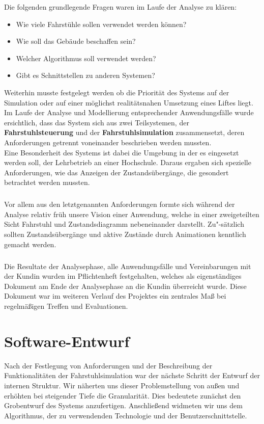Die folgenden grundlegende Fragen waren im Laufe der Analyse zu klären:
\begin{itemize}
	\item Wie viele Fahrstühle sollen verwendet werden können?
	\item Wie soll das Gebäude beschaffen sein?
	\item Welcher Algorithmus soll verwendet werden?
	\item Gibt es Schnittstellen zu anderen Systemen?
\end{itemize}
Weiterhin musste festgelegt werden ob die Priorität des Systems auf der Simulation oder auf einer möglichst realitätsnahen Umsetzung eines Liftes liegt. Im Laufe der Analyse und Modellierung entsprechender Anwendungsfälle wurde ersichtlich, dass das System sich aus zwei Teilsystemen, der \textbf{Fahrstuhlsteuerung} und der \textbf{Fahrstuhlsimulation} zusammensetzt, deren Anforderungen getrennt voneinander beschrieben werden mussten.\\
Eine Besonderheit des Systems ist dabei die Umgebung in der es eingesetzt werden soll, der Lehrbetrieb an einer Hochschule. Daraus ergaben sich spezielle Anforderungen, wie das Anzeigen der Zustandsübergänge, die gesondert betrachtet werden mussten.

\paragraph{}Vor allem aus den letztgenannten Anforderungen formte sich während der Analyse relativ früh unsere Vision einer Anwendung, welche in einer zweigeteilten Sicht Fahrstuhl und Zustandsdiagramm nebeneinander darstellt. Zu"-sätzlich sollten Zustandsübergänge und aktive Zustände durch Animationen kenntlich gemacht werden.

\paragraph*{}Die Resultate der Analysephase, alle Anwendungsfälle und Vereinbarungen mit der Kundin wurden im Pflichtenheft festgehalten, welches als eigenständiges Dokument am Ende der Analysephase an die Kundin überreicht wurde. Diese Dokument war im weiteren Verlauf des Projektes ein zentrales Maß bei regelmäßigen Treffen und Evaluationen.

\chapter{Software-Entwurf}
Nach der Festlegung von Anforderungen und der Beschreibung der Funktionalitäten der Fahrstuhlsimulation war der nächste Schritt der Entwurf der internen Struktur. Wir näherten uns dieser Problemstellung von außen und erhöhten bei steigender Tiefe die Granularität. Dies bedeutete zunächst den Grobentwurf des Systems anzufertigen. Anschließend widmeten wir uns dem Algorithmus, der zu verwendenden Technologie und der Benutzerschnitt\-stelle.

